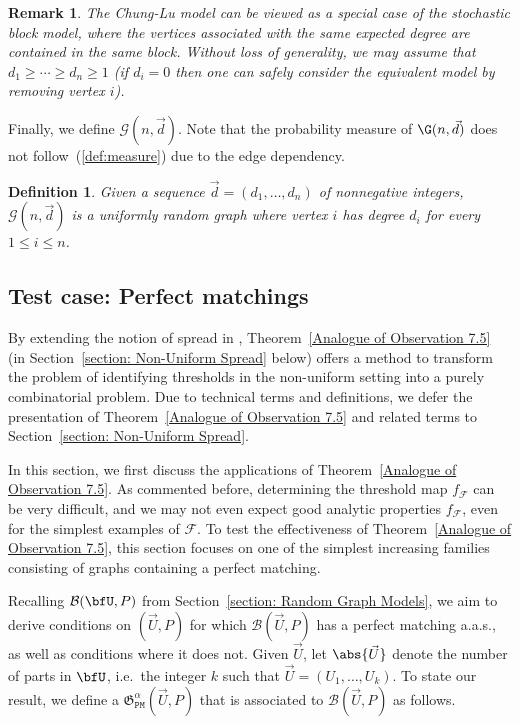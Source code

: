 \documentclass[12pt]{article}
\newtheorem*{definition*}{Definition}
\newtheorem*{remark*}{Remark}
\begin{document}
\begin{remark*}
\normalfont
The Chung-Lu model can be viewed as a special case of the stochastic block model, where the vertices associated with the same expected degree are contained in the same block.
Without loss of generality, we may assume that $d_1\geq\cdots\geq d_n\geq 1$ (if $d_i=0$ then one can safely consider the equivalent model by removing vertex $i$). 
\end{remark*}

Finally, we define  $\mathcal{G}(n,\vec{d})$. Note that the probability measure of $\G(n,\vec{d})$ does not follow~(\ref{def:measure}) due to the edge dependency.
    
\begin{definition*}
Given a sequence $\vec{d} = (d_1,\ldots, d_n)$ of nonnegative integers, $\mathcal{G}(n,\vec{d})$ is a uniformly random graph where vertex $i$ has degree $d_i$ for every $1\le i\le n$.
\end{definition*}

\subsection{Test case: Perfect matchings}\label{section: Test Case with Perfect Matchings}

By extending the notion of spread in \cite{frankston2019thresholds}, Theorem~\ref{Analogue of Observation 7.5} (in Section~\ref{section: Non-Uniform Spread} below) offers a method to transform the problem of identifying thresholds in the non-uniform setting into a purely combinatorial problem. Due to technical terms and definitions, we defer the presentation of Theorem~\ref{Analogue of Observation 7.5} and related terms to Section~\ref{section: Non-Uniform Spread}.

In this section, we first discuss the applications of Theorem~\ref{Analogue of Observation 7.5}. As commented before, determining the threshold map $f_{\mathcal{F}}$ can be very difficult, and we may not even expect good analytic properties $f_{\mathcal{F}}$, even for the simplest examples of $\mathcal{F}$. To test the effectiveness of Theorem~\ref{Analogue of Observation 7.5}, this section focuses on one of the simplest increasing families consisting of graphs containing a perfect matching.

Recalling $\mathcal{B}(\bfU,P)$ from Section~\ref{section: Random Graph Models}, we aim to derive conditions on $(\vec{U},P)$ for which $\mathcal{B}(\vec{U},P)$ has a perfect matching a.a.s., as well as conditions where it does not. Given $\vec{U}$, let $\abs{\vec{U}}$ denote the number of parts in $\bfU$, i.e.\ the integer $k$ such that $\vec{U}=(U_1,\ldots,U_k)$. To state our result, we define a  $\mathfrak{G}_{\texttt{PM}}^\alpha(\vec{U}, P)$ that is associated to $\mathcal{B}(\vec{U},P)$ as follows.
\end{document}
